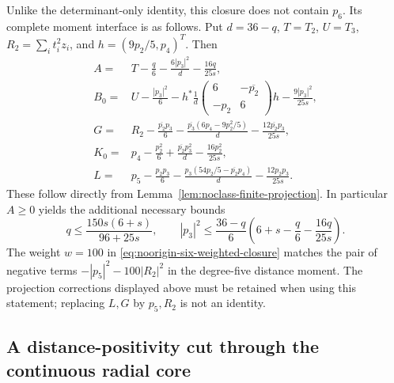 \documentclass[11pt]{article}
\theoremstyle{remark}
\numberwithin{equation}{section}
\begin{document}
Unlike the determinant-only identity, this closure does not contain
$p_6$. Its complete moment interface is as follows. Put $d=36-q$,
$T=T_2$, $U=T_3$, $R_2=\sum_i t_i^2z_i$, and
$h=(9p_2/5,p_4)^T$. Then
\begin{align*}
 A={}&T-\frac q6-\frac{6|p_3|^2}{d}-\frac{16q}{25s},\\
 B_0={}&U-\frac{|p_3|^2}{6}
       -h^*\frac1d\begin{pmatrix}6&-\overline{p_2}\\-p_2&6\end{pmatrix}h
       -\frac{9|p_3|^2}{25s},\\
 G={}&R_2-\frac{\overline{p_2}p_3}{6}
       -\frac{\overline{p_3}(6p_4-9p_2^2/5)}{d}
       -\frac{12\overline{p_2}p_3}{25s},\\
 K_0={}&p_4-\frac{p_2^2}{6}
       +\frac{\overline{p_2}p_3^2}{d}-\frac{16p_2^2}{25s},\\
 L={}&p_5-\frac{p_2p_3}{6}
       -\frac{p_3(54p_2/5-\overline{p_2}p_4)}d
       -\frac{12p_2p_3}{25s}.
\end{align*}
These follow directly from Lemma~\ref{lem:noclass-finite-projection}.
In particular $A\ge0$ yields the additional necessary bounds
\[
 q\le\frac{150s(6+s)}{96+25s},\qquad
 |p_3|^2\le\frac{36-q}{6}
       \left(6+s-\frac q6-\frac{16q}{25s}\right).
\]
The weight $w=100$ in \eqref{eq:noorigin-six-weighted-closure}
matches the pair of negative terms
$-|p_5|^2-100|R_2|^2$ in the degree-five distance moment.
The projection corrections displayed above must be retained when
using this statement; replacing $L,G$ by $p_5,R_2$ is not an identity.

\subsection{A distance-positivity cut through the continuous radial core}
\end{document}
